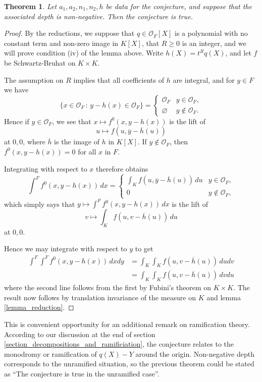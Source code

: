 \documentclass{lmsMODIFIED}
\newtheorem{theorem}{Theorem}[section] %
\newcommand{\roi}{\mathcal{O}}
\newcommand{\res}[1]{\overline{#1}}
\begin{document}
\begin{theorem}\label{theorem_R_positive}
Let $a_1,a_2,n_1,n_2,h$ be data for the conjecture, and suppose that the associated depth is non-negative. Then the conjecture is true.
\end{theorem}
\begin{proof}
By the reductions, we suppose that $q\in\roi_{F}[X]$ is a polynomial with no constant term and non-zero image in $ K [X]$, that $R\ge0$ is an integer, and we will prove condition (iv) of the lemma above. Write $h(X)=t^Rq(X)$, and let $f$ be Schwartz-Bruhat on $K\times K$.

The assumption on $R$ implies that all coefficients of $h$ are integral, and for $y\in F$ we have
\[ \{x\in \roi_{F}\,:\,y-h(x)\in\roi_{F}\}
	=\begin{cases}
		\roi_{F}&y\in\roi_{F},\\
		\varnothing & y\notin\roi_{F}.
	\end{cases}
\]
Hence if $y\in\roi_{F}$, we see that $x\mapsto f^0(x,y-h(x))$ is the lift of \[u\mapsto f(u,\res{y}-\res{h}(u))\] at $0,0$, where $\res{h}$ is the image of $h$ in $ K [X]$. If $y\notin \roi_{F}$, then $f^0(x,y-h(x))=0$ for all $x$ in $F$.

Integrating with respect to $x$ therefore obtains \[\int^F f^0(x,y-h(x))\,dx=\begin{cases} \int_K f(u,\res{y}-\res{h}(u))\,du & y\in \roi_{F}, \\ 0 & y\notin \roi_{F},\end{cases}\] which simply says that $y\mapsto \int^F f^0(x,y-h(x))\,dx$ is the lift of \[v\mapsto \int_K f(u,v-\res{h}(u))\,du\] at $0,0$.

Hence we may integrate with respect to $y$ to get
\begin{eqnarray*}\int^F\int^F f^0(x,y-h(x))\,dxdy
	&=\int_K\int_K f(u,v-\res{h}(u))\,dudv\\
	&=\int_K\int_K f(u,v-\res{h}(u))\,dvdu
\end{eqnarray*}
where the second line follows from the first by Fubini's theorem on $K\times K$. The result now follows by translation invariance of the measure on $K$ and lemma \ref{lemma_reduction}.
\end{proof}

\begin{remark}
This is convenient opportunity for an additional remark on ramification theory. According to our discussion at the end of section \ref{section_decompositions_and_ramificiation}, the conjecture relates to the monodromy or ramification of $q(X)-Y$ around the origin. Non-negative depth corresponds to the unramified situation, so the previous theorem could be stated as ``The conjecture is true in the unramified case''.
\end{remark}
\end{document}

